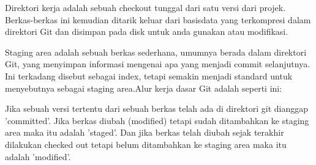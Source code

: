 \noindent 
Direktori kerja adalah sebuah checkout tunggal dari satu versi dari projek. Berkas-berkas ini kemudian ditarik keluar dari basisdata yang terkompresi dalam direktori Git dan disimpan pada disk untuk anda gunakan atau modifikasi. \par
Staging area adalah sebuah berkas sederhana, umumnya berada dalam direktori Git, yang menyimpan informasi mengenai apa yang menjadi commit selanjutnya. Ini terkadang disebut sebagai index, tetapi semakin menjadi standard untuk menyebutnya sebagai staging area.Alur kerja dasar Git adalah seperti ini: \par
\noindent 
 \par
Jika sebuah versi tertentu dari sebuah berkas telah ada di direktori git dianggap 'committed'. Jika berkas diubah (modified) tetapi sudah ditambahkan ke staging area  maka itu adalah 'staged'. Dan jika berkas telah diubah sejak terakhir dilakukan checked out tetapi belum ditambahkan ke staging area maka itu adalah 'modified'.  \par
